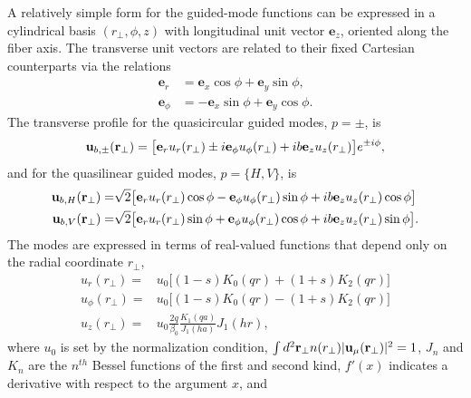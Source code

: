 \documentclass[preprint, aps,pra,onecolumn]{revtex4-1} %
\begin{document}
\begin{appendix}
A relatively simple form for the guided-mode functions can be expressed in a cylindrical basis $(r_\perp, \phi, z)$ with longitudinal unit vector $\mathbf{e}_z$, oriented along the fiber axis.  
The transverse unit vectors are related to their fixed Cartesian counterparts via the relations
\begin{subequations}
	\begin{align}
		\mathbf{e}_r     &= \mathbf{e}_x \cos \phi + \mathbf{e}_y \sin \phi, \\
		\mathbf{e}_\phi &= - \mathbf{e}_x \sin \phi + \mathbf{e}_y \cos \phi.
	\end{align}
\end{subequations}
The transverse profile for the quasicircular guided modes, $p = \pm$, is
	\begin{align} \label{Eq::QuasicircularModes}
		\mathbf{u}_{b,\pm}(\mathbf{r}_\perp) = \big[\mathbf{e}_r u_r(r_\perp) \pm i \mathbf{e}_\phi u_\phi(r_\perp) +  i b \mathbf{e}_z  u_z(r_\perp) \big]e^{ \pm i \phi}, 
	\end{align}
and for the quasilinear guided modes, $p = \{H,V\}$, is
	\begin{subequations} \label{Eq::QuasilinearModes}
	\begin{align}
		\mathbf{u}_{b,H}(\mathbf{r}_\perp) = & \sqrt{2} \big[ \mathbf{e}_r u_r(r_\perp) \cos \phi - \mathbf{e}_\phi u_\phi(r_\perp) \sin \phi +  ib \mathbf{e}_z  u_z(r_\perp) \cos \phi \big] \\
		\mathbf{u}_{b,V}(\mathbf{r}_\perp) = & \sqrt{2} \big[ \mathbf{e}_r u_r(r_\perp) \sin \phi + \mathbf{e}_\phi u_\phi(r_\perp) \cos \phi +  ib \mathbf{e}_z  u_z(r_\perp) \sin \phi \big]. 
	\end{align}
	\end{subequations}
The modes are expressed in terms of real-valued functions that depend only on the radial coordinate $r_\perp$,
	\begin{subequations} \label{Eq::ProfileFunctions}
	\begin{align} 
		u_r(r_\perp) =& u_0 \big[ (1-s) K_0(qr) + (1+s)K_2(qr)\big] \\
		u_\phi(r_\perp) =& u_0\big[ (1-s) K_0(qr) - (1+s)K_2(qr)\big] \\
		u_z(r_\perp) =& u_0 \frac{2 q}{\beta_0} \frac{K_1(qa)}{J_1(ha)} J_1(hr), \label{Eq::zprofile}
	\end{align}
	\end{subequations}
where $u_0$ is set by the normalization condition, $\int d^2 \mathbf{r}_\perp n(r_\perp) | \mathbf{u}_\mu(\mathbf{r}_\perp)|^2=1$, $J_n$ and $K_n$ are the $n^{th}$ Bessel functions of the first and second kind, $f'(x)$ indicates a derivative with respect to the argument $x$, and 

\end{appendix}
\end{document}
